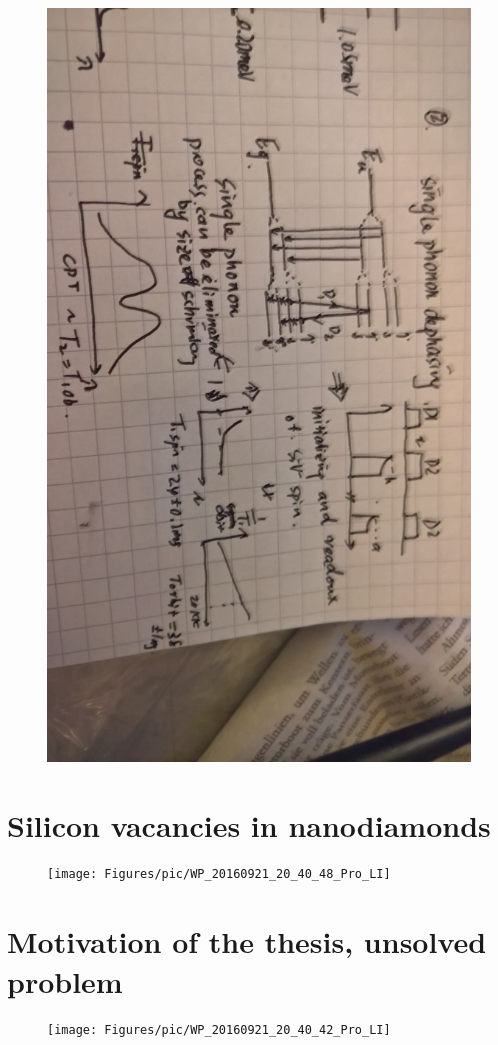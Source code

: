 \begin{figure}[h]
\centering
\includegraphics[width=0.7\linewidth]{Figures/pic/WP_20160921_20_40_32_Pro_LI}
\caption{}
\label{fig:wp20160921204032proli}
\end{figure}
\FloatBarrier


\section[Silicon vacancies in nanodiamonds]{Silicon vacancies in nanodiamonds}
\FloatBarrier
\begin{figure}[h]
\centering
\texttt{[image: Figures/pic/WP\_20160921\_20\_40\_48\_Pro\_LI]}
\caption{}
\label{fig:wp20160921204048proli}
\end{figure}
\FloatBarrier

\section[Motivation of the thesis, unsolved problem]{Motivation of the thesis, unsolved problem}
\FloatBarrier
\begin{figure}[h]
	\centering
	\texttt{[image: Figures/pic/WP\_20160921\_20\_40\_42\_Pro\_LI]}
	\caption{}
	\label{fig:wp20160921204042proli}
\end{figure}
\FloatBarrier
